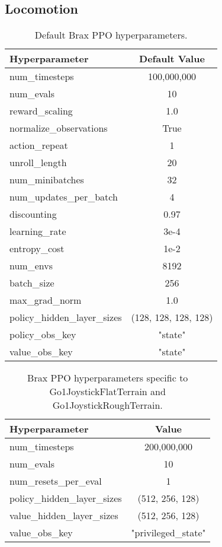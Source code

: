 \clearpage

\subsection{Locomotion}

\begin{table}[ht]
\centering
\begin{tabular}{|l|c|} 
\hline
\textbf{Hyperparameter} & \textbf{Default Value} \\ \hline
num\_timesteps & 100,000,000 \\ \hline
num\_evals & 10  \\ \hline
reward\_scaling & 1.0 \\ \hline
normalize\_observations & True \\ \hline
action\_repeat & 1 \\ \hline
unroll\_length & 20 \\ \hline
num\_minibatches & 32 \\ \hline
num\_updates\_per\_batch & 4 \\ \hline
discounting & 0.97 \\ \hline
learning\_rate & 3e-4 \\ \hline
entropy\_cost & 1e-2 \\ \hline
num\_envs & 8192 \\ \hline
batch\_size & 256 \\ \hline
max\_grad\_norm & 1.0 \\ \hline
policy\_hidden\_layer\_sizes & (128, 128, 128, 128) \\ \hline 
policy\_obs\_key & "state" \\ \hline
value\_obs\_key & "state" \\ \hline
\end{tabular}
\caption{Default Brax PPO hyperparameters.}
\end{table}

\begin{table}[ht]
\centering
\begin{tabular}{|l|c|} 
\hline
\textbf{Hyperparameter} & \textbf{Value} \\ \hline
num\_timesteps & 200,000,000 \\ \hline
num\_evals & 10  \\ \hline
num\_resets\_per\_eval & 1 \\ \hline
policy\_hidden\_layer\_sizes & (512, 256, 128) \\ \hline 
value\_hidden\_layer\_sizes & (512, 256, 128) \\ \hline 
value\_obs\_key & "privileged\_state" \\ \hline
\end{tabular}
\caption{Brax PPO hyperparameters specific to Go1JoystickFlatTerrain and Go1JoystickRoughTerrain.}
\end{table}


